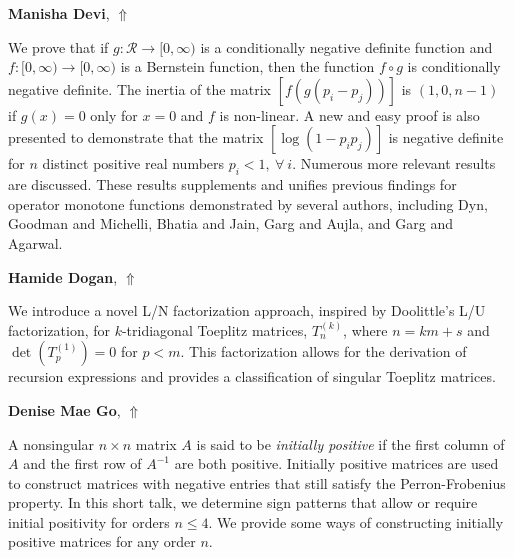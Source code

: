 \documentclass[ILAS2025-program.tex]{subfiles}
\begin{document}
\hypertarget{down0108}{}\begin{ilasabstract}
    
\textbf{Manisha Devi},  \hfill \hyperlink{up0108}{$\Uparrow$}
    
    
\mtskip
    We prove that if $g:\mathcal{R}\rightarrow[0,\infty)$ is a conditionally negative definite function and $f:[0,\infty)\rightarrow[0,\infty)$ is a Bernstein function, then the function $f\circ g$ is conditionally negative definite. The inertia of the matrix $[f(g(p_i-p_j))]$ is $(1,0,n-1)$ if $g(x)=0$ only for $x=0$ and $f$ is non-linear. A new and easy proof is also presented to demonstrate that the matrix $[\log(1-p_ip_j)]$ is negative definite for $n$ distinct positive real numbers $p_i<1, ~\forall~i$. Numerous more relevant results are discussed. These results supplements and unifies previous findings for operator monotone functions demonstrated by several authors, including Dyn, Goodman and Michelli, Bhatia and Jain, Garg and Aujla, and Garg and Agarwal.
\end{ilasabstract}
    

\hypertarget{down0400}{}\begin{ilasabstract}
    
\textbf{Hamide Dogan},  \hfill \hyperlink{up0400}{$\Uparrow$}
    
    
\mtskip
    We introduce a novel L/N factorization approach, inspired by Doolittle's L/U factorization, for 
$k$-tridiagonal Toeplitz matrices, $T^{(k)}_n$, where $n=km+s$ and $\det(T^{(1)}_p)=0$ for $p<m$. This factorization allows for the derivation of recursion expressions and provides a classification of singular Toeplitz matrices.
\end{ilasabstract}
    

\hypertarget{down0397}{}\begin{ilasabstract}
    
\textbf{Denise Mae Go},  \hfill \hyperlink{up0397}{$\Uparrow$}
    
    
\mtskip
    A nonsingular $n \times n$ matrix $A$ is said to be \textit{initially positive} if the first column of $A$ and the first row of $A^{-1}$ are both positive. Initially positive matrices are used to construct matrices with negative entries that still satisfy the Perron-Frobenius property. In this short talk, we determine sign patterns that allow or require initial positivity for orders $n \leq 4$. We provide some ways of constructing initially positive matrices for any order $n$.

\end{ilasabstract}
    
\end{document}
